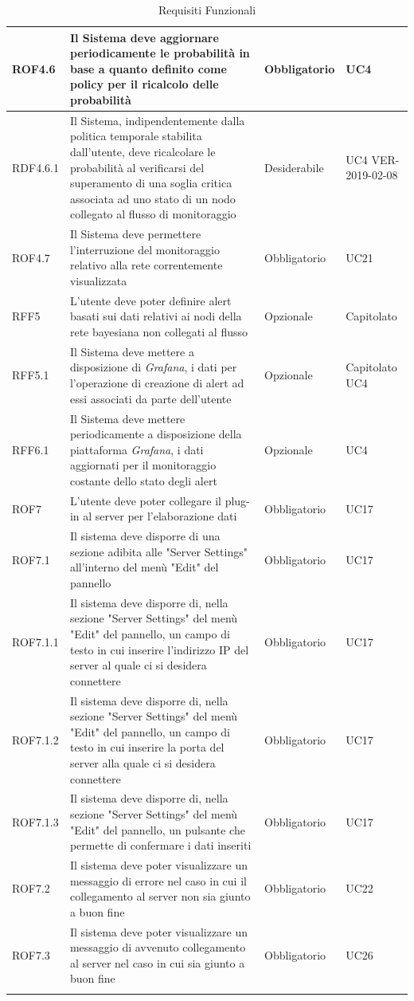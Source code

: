 \begin{center}
\begin{longtable}[c]{|m{}|m{}|m{}|m{}|}
\hline
\rowcolor{grigio}ROF4.6 & Il Sistema deve aggiornare periodicamente le probabilità in base a quanto definito come policy per il ricalcolo delle probabilità & Obbligatorio & UC4\\
\hline
RDF4.6.1 & Il Sistema, indipendentemente dalla politica temporale stabilita dall'utente, deve ricalcolare le probabilità al verificarsi del superamento di una soglia critica associata ad uno stato di un nodo collegato al flusso di monitoraggio & Desiderabile & UC4 VER-2019-02-08\\
\hline
ROF4.7 & Il Sistema deve permettere l'interruzione del monitoraggio relativo alla rete correntemente visualizzata & Obbligatorio & UC21\\
\hline
\rowcolor{grigio}RFF5 & L'utente deve poter definire alert basati sui dati relativi ai nodi della rete bayesiana non collegati al flusso & Opzionale & Capitolato\\
\hline
RFF5.1 & Il Sistema deve mettere a disposizione di \textit{Grafana}, i dati per l'operazione di creazione di alert ad essi associati da parte dell'utente & Opzionale & Capitolato UC4\\
\hline
\rowcolor{grigio}RFF6.1 & Il Sistema deve mettere periodicamente a disposizione della piattaforma \textit{Grafana}, i dati aggiornati per il monitoraggio costante dello stato degli alert & Opzionale & UC4\\
\hline

ROF7 & L'utente deve poter collegare il plug-in al server per l'elaborazione dati & Obbligatorio & UC17\\
\hline
\rowcolor{grigio}ROF7.1 & Il sistema deve disporre di una sezione adibita alle "Server Settings" all'interno del menù "Edit" del pannello & Obbligatorio & UC17\\
\hline
ROF7.1.1 & Il sistema deve disporre di, nella sezione "Server Settings" del menù "Edit" del pannello, un campo di testo in cui inserire l'indirizzo IP del server al quale ci si desidera connettere & Obbligatorio & UC17\\
\hline
\rowcolor{grigio}ROF7.1.2 & Il sistema deve disporre di, nella sezione "Server Settings" del menù "Edit" del pannello, un campo di testo in cui inserire la porta del server alla quale ci si desidera connettere & Obbligatorio & UC17\\
\hline
ROF7.1.3 & Il sistema deve disporre di, nella sezione "Server Settings" del menù "Edit" del pannello, un pulsante che permette di confermare i dati inseriti & Obbligatorio & UC17\\
\hline
\rowcolor{grigio}ROF7.2 & Il sistema deve poter visualizzare un messaggio di errore nel caso in cui il collegamento al server non sia giunto a buon fine& Obbligatorio & UC22\\
\hline
ROF7.3 & Il sistema deve poter visualizzare un messaggio di avvenuto collegamento al server nel caso in cui sia giunto a buon fine& Obbligatorio & UC26\\
\hline

\caption{Requisiti Funzionali}
\end{longtable}
\end{center}


